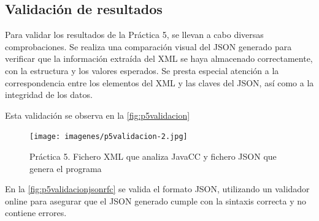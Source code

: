 


\subsection{Validación de resultados}

Para validar los resultados de la Práctica 5, se llevan a cabo diversas comprobaciones. Se realiza una comparación visual del JSON generado para verificar que la información extraída del XML se haya almacenado correctamente, con la estructura y los valores esperados. Se presta especial atención a la correspondencia entre los elementos del XML y las claves del JSON, así como a la integridad de los datos.

Esta validación se observa en la \autoref{fig:p5validacion}

\begin{figure}[H]
	\centering
	\texttt{[image: imagenes/p5validacion-2.jpg]}
	\caption{\label{fig:p5validacion}Práctica 5. Fichero XML que analiza JavaCC y fichero JSON que genera el programa}
\end{figure}

En la \autoref{fig:p5validacionjsonrfc} se valida el formato JSON, utilizando un validador online para asegurar que el JSON generado cumple con la sintaxis correcta y no contiene errores.


